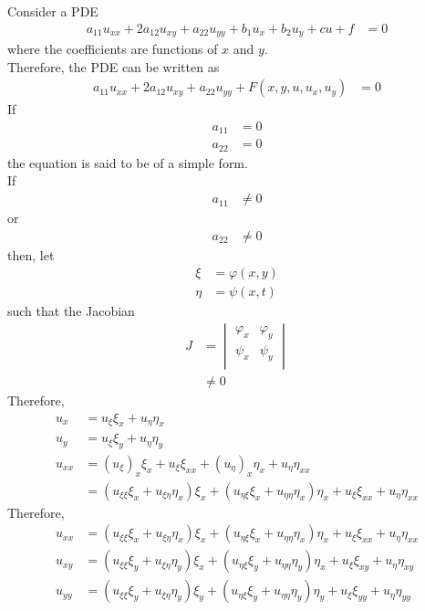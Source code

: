 \documentclass[titlepage, fleqn, a4paper, 12pt, twoside]{article}
\theoremstyle{definition}
\theoremstyle{theorem}
\begin{document}
Consider a PDE
\begin{align*}
	a_{1 1} u_{x x} + 2 a_{1 2} u_{x y} + a_{2 2} u_{y y} + b_1 u_x + b_2 u_y + c u + f & = 0
\end{align*}
where the coefficients are functions of $x$ and $y$.\\
Therefore, the PDE can be written as
\begin{align*}
	a_{1 1} u_{x x} + 2 a_{1 2} u_{x y} + a_{2 2} u_{y y} + F(x,y,u,u_x,u_y) & = 0
\end{align*}
If
\begin{align*}
	a_{1 1} & = 0 \\
	a_{2 2} & = 0
\end{align*}
the equation is said to be of a simple form.\\
If
\begin{align*}
	a_{1 1} & \neq 0
\end{align*}
or
\begin{align*}
	a_{2 2} & \neq 0
\end{align*}
then, let
\begin{align*}
	\xi  & = \varphi(x,y) \\
	\eta & = \psi(x,t)
\end{align*}
such that the Jacobian
\begin{align*}
	J                          & =
		\begin{vmatrix}
			\varphi_x  & \varphi_y \\
			\psi_x     & \psi_y    \\
		\end{vmatrix}     \\
                                   & \neq 0
\end{align*}
Therefore,
\begin{align*}
	u_x     & = u_{\xi} \xi_x + u_{\eta} \eta_x                                                   \\
	u_y     & = u_{\xi} \xi_y + u_{\eta} \eta_y                                                   \\
	u_{x x} & = (u_{\xi})_x \xi_x + u_{\xi} \xi_{x x} + (u_{\eta})_x \eta_x + u_{\eta} \eta_{x x} \\
                & = (u_{\xi \xi} \xi_x + u_{\xi \eta} \eta_x) \xi_x + (u_{\eta \xi} \xi_x + u_{\eta \eta} \eta_x) \eta_x + u_{\xi} \xi_{x x} + u_{\eta} \eta_{x x}
\end{align*}
Therefore,
\begin{align*}
	u_{x x} & = (u_{\xi \xi} \xi_x + u_{\xi \eta} \eta_x) \xi_x + (u_{\eta \xi} \xi_x + u_{\eta \eta} \eta_x) \eta_x + u_{\xi} \xi_{x x} + u_{\eta} \eta_{x x} \\
	u_{x y} & = (u_{\xi \xi} \xi_y + u_{\xi \eta} \eta_y) \xi_x + (u_{\eta \xi} \xi_y + u_{\eta \eta} \eta_y) \eta_x + u_{\xi} \xi_{x y} + u_{\eta} \eta_{x y} \\
	u_{y y} & = (u_{\xi \xi} \xi_y + u_{\xi \eta} \eta_y) \xi_y + (u_{\eta \xi} \xi_y + u_{\eta \eta} \eta_y) \eta_y + u_{\xi} \xi_{y y} + u_{\eta} \eta_{y y}
\end{align*}
\end{document}

